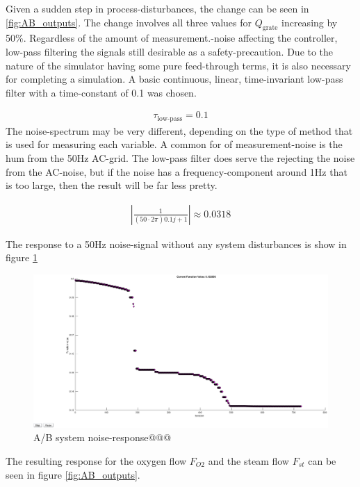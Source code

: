 Given a sudden step in process-disturbances, the change can be seen in \ref{fig:AB_outputs}. The change involves all three values for $Q_{\text{grate}}$ increasing by 50\%.  Regardless of the amount of measurement.-noise affecting the controller, low-pass filtering the signals still desirable as a safety-precaution. Due to the nature of the simulator having some pure feed-through terms, it is also necessary for completing a simulation. A basic continuous, linear, time-invariant low-pass filter with a time-constant of 0.1 was chosen.

\begin{align}
    \tau_{\text{low-pass}}= 0.1
\end{align}
The noise-spectrum may be very different, depending on the type of method that is used for measuring each variable. A common for of measurement-noise is the hum from the 50Hz AC-grid. The low-pass filter does serve the rejecting the noise from the AC-noise, but if the noise has a frequency-component around 1Hz that is too large, then the result will be far less pretty.

\begin{align}
    |\frac{1}{\left( 50 \cdot 2\pi \right) 0.1j+1}| \approx 0.0318
\end{align}

The response to a 50Hz noise-signal without any system disturbances is show in figure \ref{fig:AB_noise_response}


\begin{figure}[!ht]
    \centering
    \includegraphics[width=\textwidth]{img/autotune_PID_progress.eps}
    \caption{A/B system noise-response@@@}
    \label{fig:AB_noise_response}
\end{figure}

The resulting response for the oxygen flow  $F_{O2}$ and the steam flow $F_{st}$ can be seen in figure \ref{fig:AB_outputs}.

